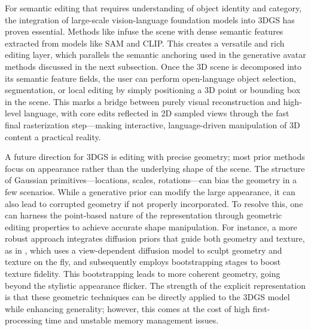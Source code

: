 \documentclass[11pt,a4paper]{article}
\begin{document}
For semantic editing that requires understanding of object identity and category, the integration of large-scale vision-language foundation models into 3DGS has proven essential. Methods like \cite{arxiv:2312.03203v3} infuse the scene with dense semantic features extracted from models like SAM and CLIP. This creates a versatile and rich editing layer, which parallels the semantic anchoring used in the generative avatar methods discussed in the next subsection. Once the 3D scene is decomposed into its semantic feature fields, the user can perform open-language object selection, segmentation, or local editing by simply positioning a 3D point or bounding box in the scene. This marks a bridge between purely visual reconstruction and high-level language, with core edits reflected in 2D sampled views through the fast final rasterization step---making interactive, language-driven manipulation of 3D content a practical reality.

A future direction for 3DGS is editing with precise geometry; most prior methods focus on appearance rather than the underlying shape of the scene. The structure of Gaussian primitives---locations, scales, rotations---can bias the geometry in a few scenarios. While a generative prior can modify the large appearance, it can also lead to corrupted geometry if not properly incorporated. To resolve this, one can harness the point-based nature of the representation through geometric editing properties \cite{arxiv:1911.13225v2} to achieve accurate shape manipulation. For instance, a more robust approach integrates diffusion priors that guide both geometry and texture, as in \cite{arxiv:2310.16818v2}, which uses a view-dependent diffusion model to sculpt geometry and texture on the fly, and subsequently employs bootstrapping stages to boost texture fidelity. This bootstrapping leads to more coherent geometry, going beyond the stylistic appearance flicker. The strength of the explicit representation is that these geometric techniques can be directly applied to the 3DGS model while enhancing generality; however, this comes at the cost of high first-processing time and unstable memory management issues.
\end{document}

